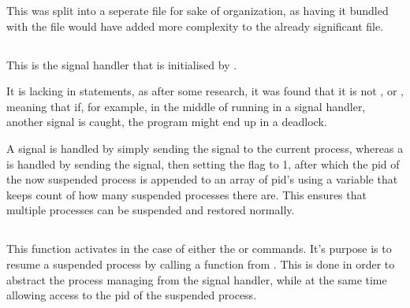 \documentclass[12pt, a4paper]{report}
\begin{document}
                This was split into a seperate file for sake of organization, as having it
                bundled with the  file would have added more complexity
                to the already significant file.

            \subsection{}
                This is the signal handler that is initialised by .
                
                \begingroup
                    \fontsize{10pt}{10pt}\selectfont
                \endgroup
                It is lacking in  statements, as after some research,
                it was found that it is not , or ,
                meaning that if, for example, in the middle of running 
                in a signal handler, another signal is caught, the program might 
                end up in a deadlock.

                A  signal is handled by simply sending the signal to the
                current process, whereas a  is handled by sending the
                signal, then setting the  flag to 1, after which the
                pid of the now suspended process is appended to an array of pid's
                using a variable that keeps count of how many suspended processes there are.
                This ensures that multiple processes can be suspended and restored normally.

                \clearpage
            \subsection{}
                This function activates in the case of either the  or
                 commands. It's purpose is to resume a suspended process
                by calling a function from . This is done 
                in order to abstract the process managing  from the signal handler, while at the same time allowing
                access to the pid of the suspended process.
                
\end{document}
